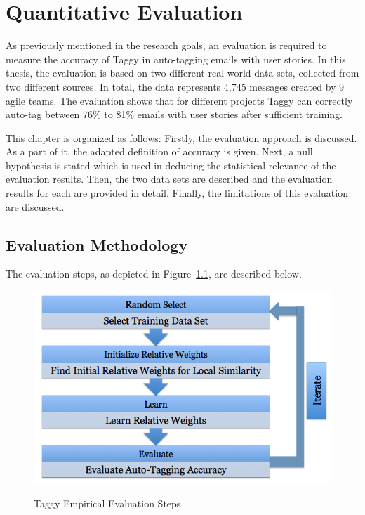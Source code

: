 \fancyhead[RO,LE]{\thepage}
\fancyfoot{} 
\chapter{Quantitative Evaluation}
\label{ch:evaluation}
As previously mentioned in the research goals, an evaluation is required to measure the accuracy of Taggy in auto-tagging emails with user stories. In this thesis, the evaluation is based on two different real world data sets, collected from two different sources. In total, the data represents 4,745 messages created by 9 agile teams. The evaluation shows that for different projects Taggy can correctly auto-tag between 76\% to 81\% emails with user stories after sufficient training.

This chapter is organized as follows: Firstly, the evaluation approach is discussed. As a part of it, the adapted definition of accuracy is given. Next, a null hypothesis is stated which is used in deducing the statistical relevance of the evaluation results. Then, the two data sets are described and the evaluation results for each are provided in detail. Finally, the limitations of this evaluation are discussed.

\section{Evaluation Methodology}
The evaluation steps, as depicted in Figure~\ref{fig:evaluation}, are described below.

\begin{figure}[h!]
	\centering
	\includegraphics[width=\textwidth]{Evaluation.png}
	\label{fig:evaluation}
  \caption{Taggy Empirical Evaluation Steps}
\end{figure}


